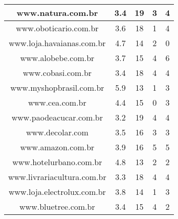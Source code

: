 \begin{center}
\begin{longtable}{|l|l|l|l|l|}
\hline
\multicolumn{1}{|c|}{www.natura.com.br} & \multicolumn{1}{c|}{3.4} & \multicolumn{1}{c|}{19} & \multicolumn{1}{c|}{3} & \multicolumn{1}{c|}{4} \\ 
\hline
\multicolumn{1}{|c|}{www.oboticario.com.br} & \multicolumn{1}{c|}{3.6} & \multicolumn{1}{c|}{18} & \multicolumn{1}{c|}{1} & \multicolumn{1}{c|}{4} \\ 
\hline
\multicolumn{1}{|c|}{www.loja.havaianas.com.br} & \multicolumn{1}{c|}{4.7} & \multicolumn{1}{c|}{14} & \multicolumn{1}{c|}{2} & \multicolumn{1}{c|}{0} \\ 
\hline
\multicolumn{1}{|c|}{www.alobebe.com.br} & \multicolumn{1}{c|}{3.7} & \multicolumn{1}{c|}{15} & \multicolumn{1}{c|}{4} & \multicolumn{1}{c|}{6} \\ 
\hline
\multicolumn{1}{|c|}{www.cobasi.com.br} & \multicolumn{1}{c|}{3.4} & \multicolumn{1}{c|}{18} & \multicolumn{1}{c|}{4} & \multicolumn{1}{c|}{4} \\ 
\hline
\multicolumn{1}{|c|}{www.myshopbrasil.com.br} & \multicolumn{1}{c|}{5.9} & \multicolumn{1}{c|}{13} & \multicolumn{1}{c|}{1} & \multicolumn{1}{c|}{3} \\ 
\hline
\multicolumn{1}{|c|}{www.cea.com.br} & \multicolumn{1}{c|}{4.4} & \multicolumn{1}{c|}{15} & \multicolumn{1}{c|}{0} & \multicolumn{1}{c|}{3} \\ 
\hline
\multicolumn{1}{|c|}{www.paodeacucar.com.br} & \multicolumn{1}{c|}{3.2} & \multicolumn{1}{c|}{19} & \multicolumn{1}{c|}{4} & \multicolumn{1}{c|}{4} \\ 
\hline
\multicolumn{1}{|c|}{www.decolar.com} & \multicolumn{1}{c|}{3.5} & \multicolumn{1}{c|}{16} & \multicolumn{1}{c|}{3} & \multicolumn{1}{c|}{3} \\ 
\hline
\multicolumn{1}{|c|}{www.amazon.com.br} & \multicolumn{1}{c|}{3.9} & \multicolumn{1}{c|}{16} & \multicolumn{1}{c|}{5} & \multicolumn{1}{c|}{5} \\ 
\hline
\multicolumn{1}{|c|}{www.hotelurbano.com.br} & \multicolumn{1}{c|}{4.8} & \multicolumn{1}{c|}{13} & \multicolumn{1}{c|}{2} & \multicolumn{1}{c|}{2} \\ 
\hline
\multicolumn{1}{|c|}{www.livrariacultura.com.br} & \multicolumn{1}{c|}{3.3} & \multicolumn{1}{c|}{18} & \multicolumn{1}{c|}{4} & \multicolumn{1}{c|}{4} \\ 
\hline
\multicolumn{1}{|c|}{www.loja.electrolux.com.br} & \multicolumn{1}{c|}{3.8} & \multicolumn{1}{c|}{14} & \multicolumn{1}{c|}{1} & \multicolumn{1}{c|}{3} \\ 
\hline
\multicolumn{1}{|c|}{www.bluetree.com.br} & \multicolumn{1}{c|}{3.4} & \multicolumn{1}{c|}{15} & \multicolumn{1}{c|}{4} & \multicolumn{1}{c|}{2} \\ 

\end{longtable}
\end{center}
